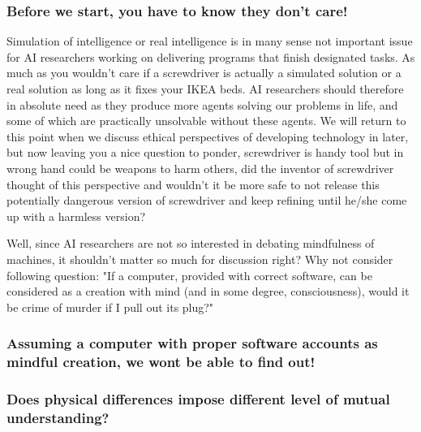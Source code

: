 \documentclass[11pt]{article}
\newenvironment{sketch}{\color{dark-green-2}}{\ignorespacesafterend}
\newenvironment{draft}{\color{dark-cornflower-blue-2}}{\ignorespacesafterend}
\begin{document}
\subsubsection*{Before we start, you have to know they don't care!}
\begin{draft}
Simulation of intelligence or real intelligence is in many sense not important issue for AI researchers working on delivering programs that finish designated tasks. As much as you wouldn't care if a screwdriver is actually a simulated solution or a real solution as long as it fixes your IKEA beds. AI researchers should therefore in absolute need as they produce more agents solving our problems in life, and some of which are practically unsolvable without these agents. We will return to this point when we discuss ethical perspectives of developing technology in later, but now leaving you a nice question to ponder, screwdriver is handy tool but in wrong hand could be weapons to harm others, did the inventor of screwdriver thought of this perspective and wouldn’t it be more safe to not release this potentially dangerous version of screwdriver and keep refining until he/she come up with a harmless version?
  
Well, since AI researchers are not so interested in debating mindfulness of machines, it shouldn't matter so much for discussion right? Why not consider following question: "If a computer, provided with correct software, can be considered as a creation with mind (and in some degree, consciousness), would it be crime of murder if I pull out its plug?"
\end{draft}

\begin{sketch}
\subsubsection*{Assuming a computer with proper software accounts as mindful creation, we wont be able to find out!}

\subsubsection*{Does physical differences impose different level of mutual understanding?}
\end{sketch}
\end{document}
